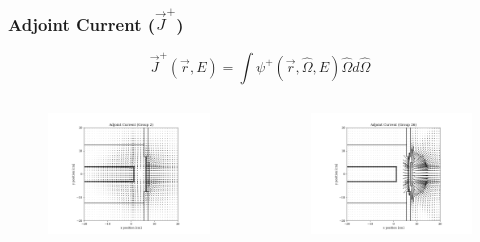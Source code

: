 \documentclass[t]{beamer}
\begin{document}
\begin{frame}
  \frametitle{Adjoint Current ($\vec{J}^+$)}
  \vskip-0.25in
  \begin{equation}
    \vec{J}^+\left(\vec{r},E\right) = \int\psi^+\left(\vec{r},\hat{\Omega},E\right)\hat{\Omega}d\hat{\Omega}
  \end{equation}
  \vskip-0.25in
  \begin{columns}
    \begin{figure}
      \includegraphics[trim={0.7in 0.15in 1.05in 0.4in},clip,scale=0.36]{images/current_adj_g02.png}
    \end{figure}
    \begin{figure}
      \includegraphics[trim={0.7in 0.15in 1.05in 0.4in},clip,scale=0.36]{images/current_adj_g26.png}

\end{figure}
\end{columns}
\end{frame}
\end{document}
